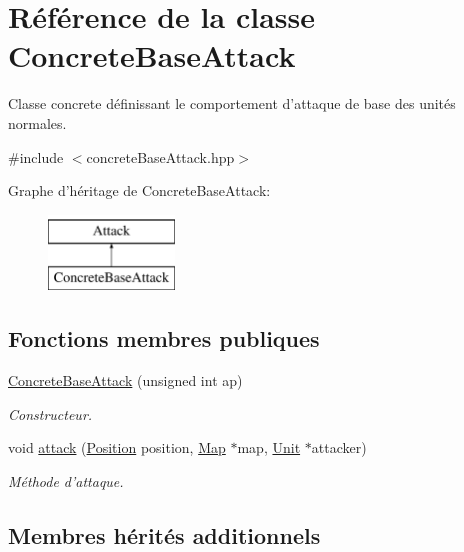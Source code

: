 \hypertarget{classConcreteBaseAttack}{\section{Référence de la classe Concrete\+Base\+Attack}
\label{classConcreteBaseAttack}
}


Classe concrete définissant le comportement d'attaque de base des unités normales.  




{\ttfamily \#include $<$concrete\+Base\+Attack.\+hpp$>$}

Graphe d'héritage de Concrete\+Base\+Attack\+:\begin{figure}[H]
\begin{center}
\leavevmode
\includegraphics[height=2.000000cm]{classConcreteBaseAttack}
\end{center}
\end{figure}
\subsection*{Fonctions membres publiques}
\begin{DoxyCompactItemize}
\item 
\hypertarget{classConcreteBaseAttack_a1695c43e01c14d65b893443866bc3ca7}{\hyperlink{classConcreteBaseAttack_a1695c43e01c14d65b893443866bc3ca7}{Concrete\+Base\+Attack} (unsigned int ap)}\label{classConcreteBaseAttack_a1695c43e01c14d65b893443866bc3ca7}

\begin{DoxyCompactList}\small\item\em Constructeur. \end{DoxyCompactList}\item 
void \hyperlink{classConcreteBaseAttack_a35cf2248ae6a719ba6041f95ea1428a2}{attack} (\hyperlink{classPosition}{Position} position, \hyperlink{classMap}{Map} $\ast$map, \hyperlink{classUnit}{Unit} $\ast$attacker)
\begin{DoxyCompactList}\small\item\em Méthode d'attaque. \end{DoxyCompactList}\end{DoxyCompactItemize}
\subsection*{Membres hérités additionnels}


